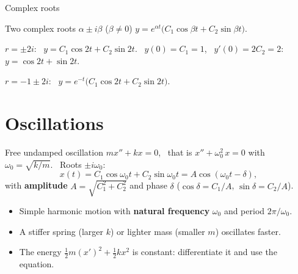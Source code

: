 \documentclass[10pt]{wosm-slides}
\begin{document}
\begin{frame}{Complex roots}
  \begin{block}{Two complex roots $\alpha \pm i\beta$ ($\beta \ne 0$)}
    $y = e^{\alpha t}\bigl(C_1 \cos\beta t + C_2 \sin\beta t\bigr)$.
  \end{block}
  \pause
  \begin{example}[$y'' + 4y = 0$, \ $y(0) = 1$, $y'(0) = 2$]
    $r = \pm 2i$: \ $y = C_1\cos 2t + C_2 \sin 2t$. \ $y(0) = C_1 = 1$, \ $y'(0) = 2C_2 = 2$:
    \ $y = \cos 2t + \sin 2t$.
  \end{example}
  \pause
  \begin{example}[$y'' + 2y' + 5y = 0$: an oscillation that dies out]
    $r = -1 \pm 2i$: \ $y = e^{-t}\bigl(C_1 \cos 2t + C_2 \sin 2t\bigr)$.
  \end{example}
\end{frame}

\section{Oscillations}

\begin{frame}{Free undamped oscillation}
  $m x'' + k x = 0$, \ that is $x'' + \omega_0^2\, x = 0$ with $\omega_0 = \sqrt{k/m}$. \ Roots $\pm i\omega_0$:
  \[ x(t) = C_1 \cos\omega_0 t + C_2 \sin\omega_0 t = A\cos(\omega_0 t - \delta) , \]
  with \textbf{amplitude} $A = \sqrt{C_1^2 + C_2^2}$ and phase $\delta$ ($\cos\delta = C_1/A$, $\sin\delta = C_2/A$).
  \pause
  \begin{itemize}
    \item Simple harmonic motion with \textbf{natural frequency} $\omega_0$ and period $2\pi/\omega_0$.
    \item A stiffer spring (larger $k$) or lighter mass (smaller $m$) oscillates faster.
    \item The energy $\frac12 m (x')^2 + \frac12 k x^2$ is constant: differentiate it and use the equation.
  \end{itemize}
\end{frame}
\end{document}
